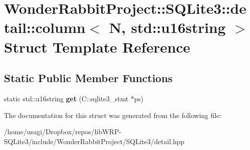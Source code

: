 \hypertarget{structWonderRabbitProject_1_1SQLite3_1_1detail_1_1column_3_01N_00_01std_1_1u16string_01_4}{\section{Wonder\-Rabbit\-Project\-:\-:S\-Q\-Lite3\-:\-:detail\-:\-:column$<$ N, std\-:\-:u16string $>$ Struct Template Reference}
\label{structWonderRabbitProject_1_1SQLite3_1_1detail_1_1column_3_01N_00_01std_1_1u16string_01_4}
}
\subsection*{Static Public Member Functions}
\begin{DoxyCompactItemize}
\item 
\hypertarget{structWonderRabbitProject_1_1SQLite3_1_1detail_1_1column_3_01N_00_01std_1_1u16string_01_4_aea0320f77a67e9363ed99a0ca3606c6e}{static std\-::u16string {\bfseries get} (C\-::sqlite3\-\_\-stmt $\ast$ps)}\label{structWonderRabbitProject_1_1SQLite3_1_1detail_1_1column_3_01N_00_01std_1_1u16string_01_4_aea0320f77a67e9363ed99a0ca3606c6e}

\end{DoxyCompactItemize}


The documentation for this struct was generated from the following file\-:\begin{DoxyCompactItemize}
\item 
/home/usagi/\-Dropbox/repos/lib\-W\-R\-P-\/\-S\-Q\-Lite3/include/\-Wonder\-Rabbit\-Project/\-S\-Q\-Lite3/detail.\-hpp\end{DoxyCompactItemize}
